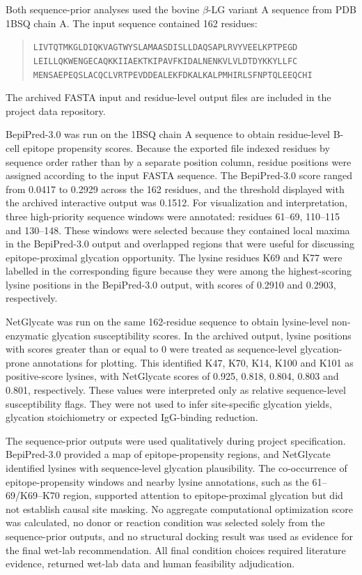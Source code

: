 Both sequence-prior analyses used the bovine $\beta$-LG variant A sequence from
PDB 1BSQ chain A. The input sequence contained 162 residues:
\begin{quote}
\footnotesize
\texttt{LIVTQTMKGLDIQKVAGTWYSLAMAASDISLLDAQSAPLRVYVEELKPTPEGD}\\
\texttt{LEILLQKWENGECAQKKIIAEKTKIPAVFKIDALNENKVLVLDTDYKKYLLFC}\\
\texttt{MENSAEPEQSLACQCLVRTPEVDDEALEKFDKALKALPMHIRLSFNPTQLEEQCHI}
\end{quote}
The archived FASTA input and residue-level output files are included in
the project data repository.

BepiPred-3.0 was run on the 1BSQ chain A sequence to obtain residue-level
B-cell epitope propensity scores. Because the exported file indexed residues by
sequence order rather than by a separate position column, residue positions were
assigned according to the input FASTA sequence. The BepiPred-3.0 score ranged
from 0.0417 to 0.2929 across the 162 residues, and the threshold displayed with
the archived interactive output was 0.1512. For visualization and interpretation,
three high-priority sequence windows were annotated: residues 61--69, 110--115
and 130--148. These windows were selected because they contained local maxima in
the BepiPred-3.0 output and overlapped regions that were useful for discussing
epitope-proximal glycation opportunity. The lysine residues K69 and K77 were
labelled in the corresponding figure because they were among the highest-scoring
lysine positions in the BepiPred-3.0 output, with scores of 0.2910 and 0.2903,
respectively.

NetGlycate was run on the same 162-residue sequence to obtain lysine-level
non-enzymatic glycation susceptibility scores. In the archived output, lysine
positions with scores greater than or equal to 0 were treated as sequence-level
glycation-prone annotations for plotting. This identified K47, K70, K14, K100
and K101 as positive-score lysines, with NetGlycate scores of 0.925, 0.818,
0.804, 0.803 and 0.801, respectively. These values were interpreted only as
relative sequence-level susceptibility flags. They were not used to infer
site-specific glycation yields, glycation stoichiometry or expected IgG-binding
reduction.

The sequence-prior outputs were used qualitatively during project specification.
BepiPred-3.0 provided a map of epitope-propensity regions, and NetGlycate
identified lysines with sequence-level glycation plausibility. The co-occurrence
of epitope-propensity windows and nearby lysine annotations, such as the
61--69/K69--K70 region, supported attention to epitope-proximal glycation but
did not establish causal site masking. No aggregate computational optimization
score was calculated, no donor or reaction condition was selected solely from
the sequence-prior outputs, and no structural docking result was used as evidence
for the final wet-lab recommendation. All final condition choices required
literature evidence, returned wet-lab data and human feasibility adjudication.

